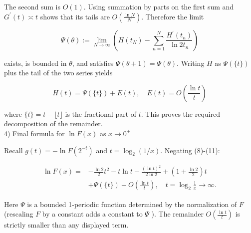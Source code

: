 \documentclass[10pt]{article}
\begin{document}
The second sum is $O(1)$. Using summation by parts on the first sum and $G^{\prime}(t) \asymp t$ shows that its tails are $O\left(\frac{\ln N}{N}\right)$. Therefore the limit

$$
\Psi(\theta):=\lim _{N \rightarrow \infty}\left(H\left(t_{N}\right)-\sum_{n=1}^{N} \frac{H^{\prime}\left(t_{n}\right)}{\ln 2 t_{n}}\right)
$$

exists, is bounded in $\theta$, and satisfies $\Psi(\theta+1)=\Psi(\theta)$. Writing $H$ as $\Psi(\{t\})$ plus the tail of the two series yields


\begin{equation*}
H(t)=\Psi(\{t\})+E(t), \quad E(t)=O\left(\frac{\ln t}{t}\right) \tag{11}
\end{equation*}


where $\{t\}=t-\lfloor t\rfloor$ is the fractional part of $t$. This proves the required decomposition of the remainder.\\
4) Final formula for $\ln F(x)$ as $x \rightarrow 0^{+}$

Recall $g(t)=-\ln F\left(2^{-t}\right)$ and $t=\log _{2}(1 / x)$. Negating (8)-(11):

$$
\begin{aligned}
\ln F(x)= & -\frac{\ln 2}{2} t^{2}-t \ln t-\frac{(\ln t)^{2}}{2 \ln 2}+\left(1+\frac{\ln 2}{2}\right) t \\
& +\Psi(\{t\})+O\left(\frac{\ln t}{t}\right), \quad t=\log _{2} \frac{1}{x} \rightarrow \infty .
\end{aligned}
$$

Here $\Psi$ is a bounded 1-periodic function determined by the normalization of $F$ (rescaling $F$ by a constant adds a constant to $\Psi$ ). The remainder $O\left(\frac{\ln t}{t}\right)$ is strictly smaller than any displayed term.
\end{document}
